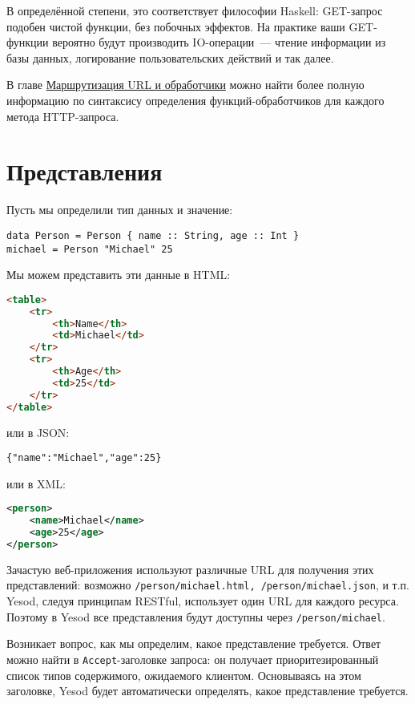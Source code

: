 В определённой степени, это соответствует философии Haskell: GET-запрос подобен
чистой функции, без побочных эффектов. На практике ваши GET-функции вероятно
будут производить IO-операции~--- чтение информации из базы данных, логирование
пользовательских действий и так далее.

В главе \hyperref[chap:routing]{Маршрутизация URL и обработчики} можно найти
более полную информацию по синтаксису определения функций-обработчиков для
каждого метода HTTP-запроса.

\section{Представления}

Пусть мы определили тип данных и значение:

\begin{lstlisting}
data Person = Person { name :: String, age :: Int }
michael = Person "Michael" 25
\end{lstlisting}

Мы можем представить эти данные в HTML:
\begin{lstlisting}[language=HTML]
 <table>
    <tr>
        <th>Name</th>
        <td>Michael</td>
    </tr>
    <tr>
        <th>Age</th>
        <td>25</td>
    </tr>
</table>
\end{lstlisting}

или в JSON:

\begin{lstlisting}
{"name":"Michael","age":25}
\end{lstlisting}

или в XML:
\begin{lstlisting}[language=XML]
<person>
    <name>Michael</name>
    <age>25</age>
</person>
\end{lstlisting}

Зачастую веб-приложения используют различные URL для получения этих
представлений: возможно \lstinline'/person/michael.html, /person/michael.json',
и т.п. Yesod, следуя принципам RESTful, использует один URL для каждого
ресурса. Поэтому в Yesod все представления будут доступны через
\lstinline'/person/michael'.

Возникает вопрос, как мы определим, какое представление требуется. Ответ можно
найти в \verb*|Accept|-заголовке запроса: он получает приоритезированный список
типов содержимого, ожидаемого клиентом. Основываясь на этом заголовке, Yesod
будет автоматически определять, какое представление требуется.


